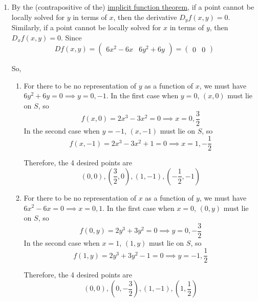 \begin{solution}
\begin{enumerate}
			\item By the (contrapositive of the) \hyperref[thm:implicit-function-theorem]{implicit function theorem}, if a point cannot be locally solved for $y$ in terms of $x$, then the derivative $D_y f(x, y) = 0$. Similarly, if a point cannot be locally solved for $x$ in terms of $y$, then $D_x f(x, y) = 0$. Since  
				\begin{equation}
					Df(x, y) = \begin{pmatrix} 6x^2 - 6x & 6y^2 + 6y \end{pmatrix} = \begin{pmatrix} 0 & 0 \end{pmatrix}
				\end{equation}

				So, 
				\begin{enumerate}
				  \item For there to be no representation of $y$ as a function of $x$, we must have $6y^2 + 6y = 0 \implies y = 0, -1$. In the first case when $y = 0$, $(x, 0)$ must lie on $S$, so 
						\begin{equation}
							f(x, 0) = 2x^3 - 3x^2 = 0 \implies x = 0, \frac{3}{2}
						\end{equation}
						In the second case when $y = -1$, $(x, -1)$ must lie on $S$, so  
						\begin{equation}
							f(x, -1) = 2x^3 - 3x^2 + 1 = 0 \implies x = 1, -\frac{1}{2}
						\end{equation}

						Therefore, the 4 desired points are 
						\begin{equation}
							(0, 0), (\frac{3}{2}, 0), (1, -1), (-\frac{1}{2}, -1)
						\end{equation}

				  \item For there to be no representation of $x$ as a function of $y$, we must have $6x^2 - 6x = 0 \implies x = 0, 1$. In the first case when $x = 0$, $(0, y)$ must lie on $S$, so 
						\begin{equation}
							f(0, y) = 2y^3 + 3y^2 = 0 \implies y = 0, -\frac{3}{2}
						\end{equation}
						In the second case when $x = 1$, $(1, y)$ must lie on $S$, so 
						\begin{equation}
							f(1, y) = 2y^3 + 3y^2 - 1 = 0 \implies y = -1, \frac{1}{2}
						\end{equation}

						Therefore, the 4 desired points are 
						\begin{equation}
							(0, 0), (0, -\frac{3}{2}), (1, -1), (1, \frac{1}{2})
						\end{equation}
				\end{enumerate}
		\end{enumerate}
	\end{solution}

